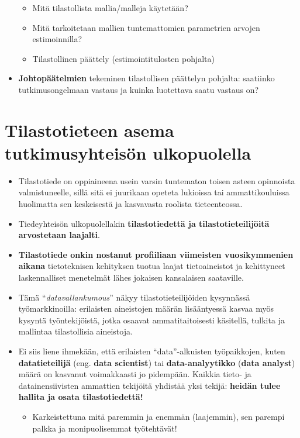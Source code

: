 \documentclass[
]{book}
\providecommand{\tightlist}{%
  \setlength{\itemsep}{0pt}\setlength{\parskip}{0pt}}
\begin{document}
\begin{itemize}
  \begin{itemize}
  \tightlist
  \item
    Mitä tilastollista mallia/malleja käytetään?
  \item
    Mitä tarkoitetaan mallien tuntemattomien parametrien arvojen estimoinnilla?
  \item
    Tilastollinen päättely (estimointitulosten pohjalta)
  \end{itemize}
\item
  \textbf{Johtopäätelmien} tekeminen tilastollisen päättelyn pohjalta: saatiinko tutkimusongelmaan vastaus ja kuinka luotettava saatu vastaus on?
\end{itemize}

\hypertarget{tilastotieteen-asema-tutkimusyhteisuxf6n-ulkopuolella}{%
\section{Tilastotieteen asema tutkimusyhteisön ulkopuolella}\label{tilastotieteen-asema-tutkimusyhteisuxf6n-ulkopuolella}}

\begin{itemize}
\tightlist
\item
  Tilastotiede on oppiaineena usein varsin tuntematon toisen asteen opinnoista valmistuneelle, sillä sitä ei juurikaan opeteta lukioissa tai ammattikouluissa huolimatta sen keskeisestä ja kasvavasta roolista tieteenteossa.
\item
  Tiedeyhteisön ulkopuolellakin \textbf{tilastotiedettä ja tilastotieteilijöitä arvostetaan laajalti}.
\item
  \textbf{Tilastotiede onkin nostanut profiiliaan viimeisten vuosikymmenien aikana} tietoteknisen kehityksen tuotua laajat tietoaineistot ja kehittyneet laskennalliset menetelmät lähes jokaisen kansalaisen saataville.
\item
  Tämä ``\emph{datavallankumous}'' näkyy tilastotieteilijöiden kysynnässä työmarkkinoilla: erilaisten aineistojen määrän lisääntyessä kasvaa myös kysyntä työntekijöistä, jotka osaavat ammatitaitoisesti käsitellä, tulkita ja mallintaa tilastollisia aineistoja.
\item
  Ei siis liene ihmekään, että erilaisten ``data''-alkuisten työpaikkojen, kuten \textbf{datatieteilijä} (eng. \textbf{data scientist}) tai \textbf{data-analyytikko} (\textbf{data analyst}) määrä on kasvanut voimakkaasti jo pidempään. Kaikkia tieto- ja datainensiivisten ammattien tekijöitä yhdistää yksi tekijä: \textbf{heidän tulee hallita ja osata tilastotiedettä!}

  \begin{itemize}
  \tightlist
  \item
    Karkeistettuna mitä paremmin ja enemmän (laajemmin), sen parempi palkka ja monipuolisemmat työtehtävät!
  \end{itemize}
\end{itemize}
\end{document}
